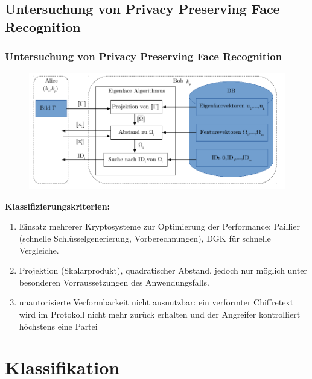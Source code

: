 \documentclass[handout,usenames,dvipsnames]{beamer}
\begin{document}
\subsection{Untersuchung von Privacy Preserving Face Recognition \cite{erkin2009privacy}}
\begin{frame}
	\frametitle{Untersuchung von Privacy Preserving Face Recognition \cite{erkin2009privacy}}
	\begin{figure}
	\includegraphics[scale=0.7]{fig/Faces.pdf} 
	\end{figure}
\end{frame}

\begin{frame}
	\textbf{Klassifizierungskriterien:}
	\begin{enumerate}
		\item Einsatz mehrerer Kryptosysteme zur Optimierung der Performance: Paillier (schnelle Schlüsselgenerierung, Vorberechnungen),  DGK für schnelle Vergleiche.
		\item Projektion (Skalarprodukt), quadratischer Abstand, jedoch nur möglich unter besonderen Vorraussetzungen des Anwendungsfalls.
		\item  unautorisierte Verformbarkeit nicht ausnutzbar: ein verformter Chiffretext wird im Protokoll nicht mehr zurück erhalten und der Angreifer kontrolliert höchstens eine Partei 
	\end{enumerate}
\end{frame}

\section{Klassifikation}
\end{document}
